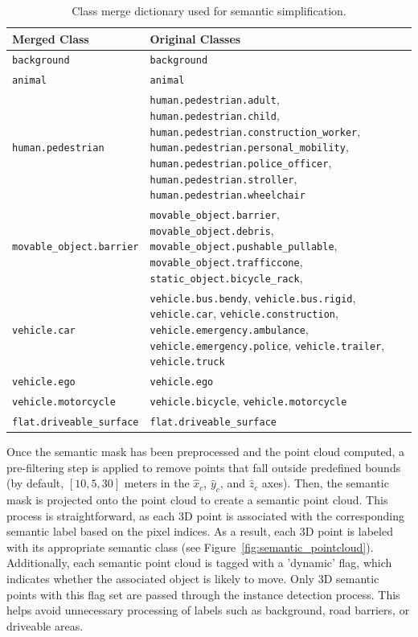 \begin{table}[h!]
    \centering
    \small
    \begin{tabular}{|l|p{10cm}|}
        \hline
        \textbf{Merged Class} & \textbf{Original Classes} \\
        \hline
        \texttt{background} & \texttt{background} \\ 
        \hline
        \texttt{animal} & \texttt{animal} \\
        \hline
        \texttt{human.pedestrian} &
        \texttt{human.pedestrian.adult}, \texttt{human.pedestrian.child}, \texttt{human.pedestrian.construction\_worker}, \texttt{human.pedestrian.personal\_mobility}, \texttt{human.pedestrian.police\_officer}, \texttt{human.pedestrian.stroller}, \texttt{human.pedestrian.wheelchair} \\
        \hline
        \texttt{movable\_object.barrier} &
        \texttt{movable\_object.barrier}, \texttt{movable\_object.debris}, \texttt{movable\_object.pushable\_pullable}, \texttt{movable\_object.trafficcone}, \texttt{static\_object.bicycle\_rack}, \\
        \hline
        \texttt{vehicle.car} & 
        \texttt{vehicle.bus.bendy}, \texttt{vehicle.bus.rigid}, \texttt{vehicle.car}, \texttt{vehicle.construction}, \texttt{vehicle.emergency.ambulance}, \texttt{vehicle.emergency.police}, \texttt{vehicle.trailer}, \texttt{vehicle.truck} \\
        \hline
        \texttt{vehicle.ego} & \texttt{vehicle.ego} \\
        \hline
        \texttt{vehicle.motorcycle} & 
        \texttt{vehicle.bicycle}, \texttt{vehicle.motorcycle} \\
        \hline
        \texttt{flat.driveable\_surface} & \texttt{flat.driveable\_surface} \\
        \hline
    \end{tabular}
    \caption{Class merge dictionary used for semantic simplification.}
    \label{tab:merge_dict}
\end{table}

Once the semantic mask has been preprocessed and the point cloud computed, a pre-filtering step is applied to remove points that fall outside predefined bounds (by default, $\left[10, 5, 30\right]$ meters in the $\hat{x}_c$, $\hat{y}_c$, and $\hat{z}_c$ axes). Then, the semantic mask is projected onto the point cloud to create a semantic point cloud. This process is straightforward, as each 3D point is associated with the corresponding semantic label based on the pixel indices. As a result, each 3D point is labeled with its appropriate semantic class (see Figure~\ref{fig:semantic_pointcloud}). Additionally, each semantic point cloud is tagged with a 'dynamic' flag, which indicates whether the associated object is likely to move. Only 3D semantic points with this flag set are passed through the instance detection process. This helps avoid unnecessary processing of labels such as background, road barriers, or driveable areas.

